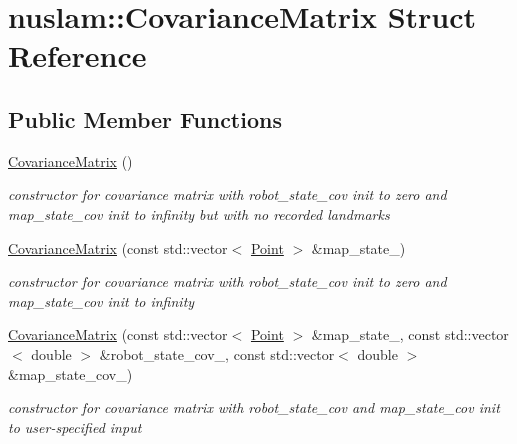 \hypertarget{structnuslam_1_1CovarianceMatrix}{}\section{nuslam\+:\+:Covariance\+Matrix Struct Reference}
\label{structnuslam_1_1CovarianceMatrix}
\subsection*{Public Member Functions}
\begin{DoxyCompactItemize}
\item 
\mbox{\label{structnuslam_1_1CovarianceMatrix_a026cf2d0618c09200a10c7f314be6966}} 
\hyperlink{structnuslam_1_1CovarianceMatrix_a026cf2d0618c09200a10c7f314be6966}{Covariance\+Matrix} ()
\begin{DoxyCompactList}\small\item\em constructor for covariance matrix with robot\+\_\+state\+\_\+cov init to zero and map\+\_\+state\+\_\+cov init to infinity but with no recorded landmarks \end{DoxyCompactList}\item 
\mbox{\label{structnuslam_1_1CovarianceMatrix_ab8879a65f665bda9f8c1d30f03d83d4b}} 
\hyperlink{structnuslam_1_1CovarianceMatrix_ab8879a65f665bda9f8c1d30f03d83d4b}{Covariance\+Matrix} (const std\+::vector$<$ \hyperlink{structnuslam_1_1Point}{Point} $>$ \&map\+\_\+state\+\_\+)
\begin{DoxyCompactList}\small\item\em constructor for covariance matrix with robot\+\_\+state\+\_\+cov init to zero and map\+\_\+state\+\_\+cov init to infinity \end{DoxyCompactList}\item 
\mbox{\label{structnuslam_1_1CovarianceMatrix_a64f30a5e35b50cd63ac0db813d678024}} 
\hyperlink{structnuslam_1_1CovarianceMatrix_a64f30a5e35b50cd63ac0db813d678024}{Covariance\+Matrix} (const std\+::vector$<$ \hyperlink{structnuslam_1_1Point}{Point} $>$ \&map\+\_\+state\+\_\+, const std\+::vector$<$ double $>$ \&robot\+\_\+state\+\_\+cov\+\_\+, const std\+::vector$<$ double $>$ \&map\+\_\+state\+\_\+cov\+\_\+)
\begin{DoxyCompactList}\small\item\em constructor for covariance matrix with robot\+\_\+state\+\_\+cov and map\+\_\+state\+\_\+cov init to user-\/specified input \end{DoxyCompactList}\end{DoxyCompactItemize}
